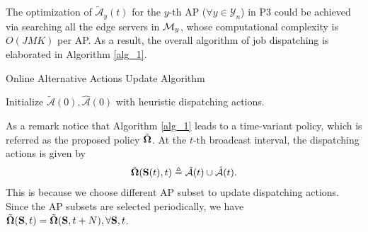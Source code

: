 The optimization of $\tilde{\mathcal{A}}_{y}(t)$ for the $y$-th AP ($\forall y\in\mathcal{Y}_{n}$) in P3 could be achieved via searching all the edge servers in $\mathcal{M}_{y}$, whose computational complexity is $O(JMK)$ per AP.
As a result, the overall algorithm of job dispatching is elaborated in Algorithm \ref{alg_1}.
\begin{algorithm}[ht]
    \caption{Online Alternative Actions Update Algorithm}\label{alg_1}
    \DontPrintSemicolon %
    Initialize $\tilde{\mathcal{A}}(0),\hat{\mathcal{A}}(0)$ with heuristic dispatching actions.\;
\end{algorithm}

As a remark notice that Algorithm \ref{alg_1} leads to a time-variant policy, which is referred as the proposed policy $\tilde{\boldsymbol{\Omega}}$.
At the $t$-th broadcast interval, the dispatching actions is given by
\begin{align}
    \tilde{\boldsymbol{\Omega}}(\mathbf{S}(t), t) \triangleq \tilde{\mathcal{A}}(t) \cup \hat{\mathcal{A}}(t).
\end{align}
This is because we choose different AP subset to update dispatching actions.
Since the AP subsets are selected periodically, we have $\tilde{\boldsymbol{\Omega}}(\mathbf{S}, t) = \tilde{\boldsymbol{\Omega}}(\mathbf{S}, t+N), \forall \mathbf{S},t$.

